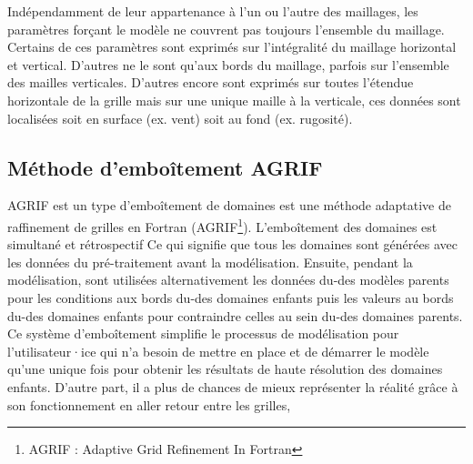 \documentclass[10pt,a4paper,titlepage]{article}
\begin{document}
Indépendamment de leur appartenance à l'un ou l'autre des maillages, les paramètres forçant le modèle ne couvrent pas toujours l'ensemble du maillage.
Certains de ces paramètres sont exprimés sur l'intégralité du maillage horizontal et vertical.
D'autres ne le sont qu'aux bords du maillage, parfois sur l'ensemble des mailles verticales.
D'autres encore sont exprimés sur toutes l'étendue horizontale de la grille mais sur une unique maille à la verticale, ces données sont localisées soit en surface (ex. vent) soit au fond (ex. rugosité).

\subsection{Méthode d'emboîtement AGRIF}
\label{anx:AGRIF}
AGRIF est un type d'emboîtement de domaines est une méthode adaptative de raffinement de grilles en Fortran (AGRIF\footnote{AGRIF : Adaptive Grid Refinement In Fortran}).
L'emboîtement des domaines est simultané et rétrospectif
Ce qui signifie que tous les domaines sont générées avec les données du pré-traitement avant la modélisation.
Ensuite, pendant la modélisation, sont utilisées alternativement les données du-des modèles parents pour les conditions aux bords du-des domaines enfants puis les valeurs au bords du-des domaines enfants pour contraindre celles au sein du-des domaines parents.
Ce système d'emboîtement simplifie le processus de modélisation pour l'utilisateur·ice qui n'a besoin de mettre en place et de démarrer le modèle qu'une unique fois pour obtenir les résultats de haute résolution des domaines enfants.
D'autre part, il a plus de chances de mieux représenter la réalité grâce à son fonctionnement en aller retour entre les grilles,
\end{document}
